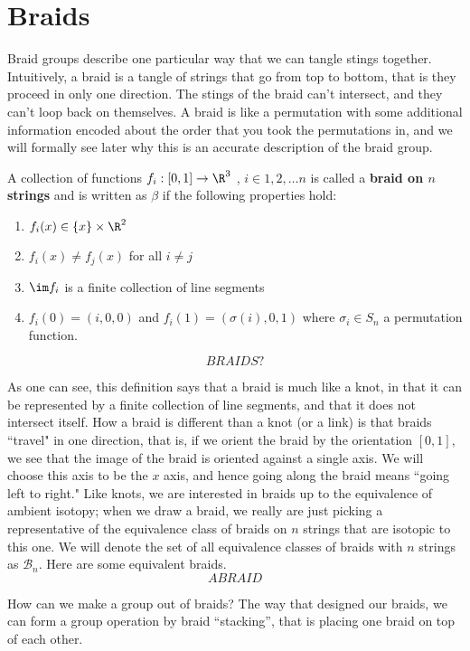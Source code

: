\section{Braids}
\label{sec:knot:braids}
Braid groups describe one particular way that we can tangle stings together. Intuitively, a braid is a tangle of strings that go from top to bottom, that is they proceed in only one direction. The stings of the braid can't intersect, and they can't loop back on themselves. A braid is like a permutation with some additional information encoded about the order that you took the permutations in, and we will formally see later why this is an accurate description of the braid group.
\begin{definition} A collection of functions $f_i:[0,1]\to \R^3$ , $i\in {1,2,\ldots n}$ is called a \textbf{braid on $n$ strings} and is written as $\beta$ if the following properties hold:
\begin{enumerate}
\item $f_i(x) \in \{x\}\times \R^2$
\item $f_i(x)\neq f_j(x)$ for all $i\neq j$
\item $\im f_i$ is a finite collection of line segments
\item $f_i(0)=(i,0,0) $ and $f_i(1)=(\sigma(i),0,1)$ where $\sigma_i\in S_n$ a permutation function.
\end{enumerate}
\end{definition}

\[
BRAIDS?
\]


As one can see, this definition says that a braid is much like a knot, in that it can be represented by a finite collection of line segments, and that it does not intersect itself. How a braid is different than a knot (or a link) is that braids ``travel" in one direction, that is, if we orient the braid by the orientation $[0,1]$, we see that the image of the braid is oriented against a single axis. We will choose this axis to be the $x$ axis, and hence going along the braid means ``going left to right." Like knots, we are interested in braids up to the equivalence of ambient isotopy; when we draw a braid, we really are just picking a representative of the equivalence class of braids on $n$
strings that are isotopic to this one. We will denote the set of all equivalence classes of braids with $n$ strings as $\mathcal{B}_n$. Here are some equivalent braids.
\[
A BRAID
\]


How can we make a group out of braids? The way that designed our braids, we can form a group operation by braid ``stacking'', that is placing one braid on top of each other. 

